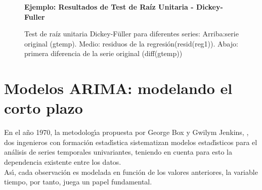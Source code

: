 \begin{figure}[h]
	\centering
	\textbf{Ejemplo: Resultados de Test de Raíz Unitaria - Dickey-Fuller}\par\medskip
	\caption{Test de raíz unitaria Dickey-Füller para diferentes series: Arriba:serie original (gtemp). Medio: residuos de la regresión(resid(reg1)). Abajo: primera diferencia de la serie original (diff(gtemp))}\label{fig5}
\end{figure}
%
\section{Modelos ARIMA: modelando el corto plazo}

En el a\~no 1970, la metodolog\'{\i}a propuesta por George Box y Gwilym Jenkins, \cite{BoxJenkins} , dos ingenieros con formaci\'on estad\'{\i}stica sistematizan modelos estad\'{\i}sticos para el an\'alisis de series temporales univariantes, teniendo en cuenta para esto la dependencia existente entre los datos. \\
As\'{\i}, cada observaci\'on es modelada en funci\'on de los valores anteriores, la variable tiempo, por tanto, juega un papel fundamental. 

